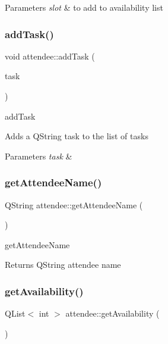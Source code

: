 \begin{DoxyParams}{Parameters}
{\em slot} & to add to availability list \\
\hline
\end{DoxyParams}
\mbox{\label{classattendee_ac80fc3f8fb032f0b856da59aaedeecab}} 
\subsubsection{\texorpdfstring{add\+Task()}{addTask()}}
{\footnotesize\ttfamily void attendee\+::add\+Task (\begin{DoxyParamCaption}\item[{Q\+String}]{task }\end{DoxyParamCaption})}



add\+Task 

Adds a Q\+String task to the list of tasks 
\begin{DoxyParams}{Parameters}
{\em task} & \\
\hline
\end{DoxyParams}
\mbox{\label{classattendee_a7af6210007dc95cb254562f5e3ed695b}} 
\subsubsection{\texorpdfstring{get\+Attendee\+Name()}{getAttendeeName()}}
{\footnotesize\ttfamily Q\+String attendee\+::get\+Attendee\+Name (\begin{DoxyParamCaption}{ }\end{DoxyParamCaption})}



get\+Attendee\+Name 

\begin{DoxyReturn}{Returns}
Q\+String attendee name 
\end{DoxyReturn}
\mbox{\label{classattendee_a2ec27aa5e40dd1bab0123f0472f2fed0}} 
\subsubsection{\texorpdfstring{get\+Availability()}{getAvailability()}}
{\footnotesize\ttfamily Q\+List$<$ int $>$ attendee\+::get\+Availability (\begin{DoxyParamCaption}{ }\end{DoxyParamCaption})}



